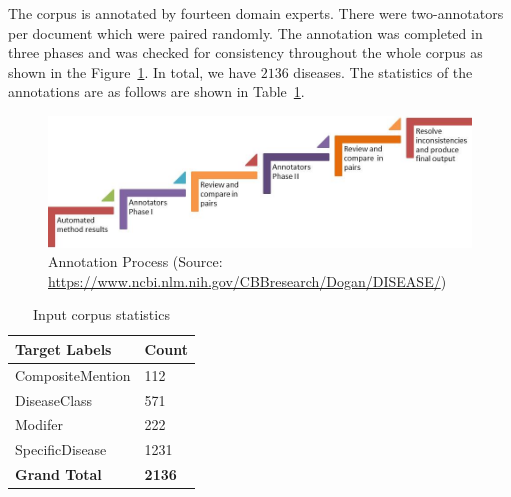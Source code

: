 The corpus is annotated by fourteen domain experts. There were two-annotators per document which were paired randomly. The annotation was completed in three phases and was checked for consistency throughout the whole corpus as shown in the Figure~\ref{fig:annotationdetails}. In total, we have $2136$ diseases. The statistics of the annotations are as follows are shown in Table~\ref{table: input_stats}. 

\begin{figure}[ht]
    \centering
    \includegraphics[scale=0.5]{Figures/annotationprocess.png}
    \caption{Annotation Process (Source: \url{https://www.ncbi.nlm.nih.gov/CBBresearch/Dogan/DISEASE/})}
    \label{fig:annotationdetails}
\end{figure}

\begin{table}[ht]
\caption{Input corpus statistics}
\label{table: input_stats}
\centering
\begin{tabular}{|l|l|}
\hline
\textbf{Target Labels} & \textbf{Count} \\ \hline
CompositeMention       & 112            \\ \hline
DiseaseClass           & 571            \\ \hline
Modifer                & 222            \\ \hline
SpecificDisease        & 1231           \\ \hline
\textbf{Grand Total}   & \textbf{2136}  \\ \hline
\end{tabular}
\end{table}


